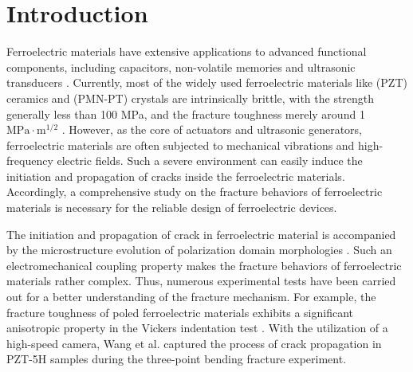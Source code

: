 \documentclass[final,times,fleqn,11pt]{elsarticle}
\begin{document}

\section{Introduction}

Ferroelectric materials have extensive applications to advanced functional components, including capacitors,  non-volatile memories and ultrasonic transducers \cite{martin_thin-film_2017}. Currently, most of the widely used ferroelectric materials like  (PZT) ceramics and  (PMN-PT) crystals are intrinsically brittle, with the strength generally less than 100 MPa, and the fracture toughness merely around {1 $\mathrm{MPa}\cdot\mathrm{m}^{1/2}$} \cite{schneider_influence_2007}. However, as the core of actuators and ultrasonic generators,  ferroelectric materials are often subjected to mechanical vibrations and high-frequency electric fields. Such a severe environment can easily induce the initiation and propagation of cracks inside the ferroelectric materials. Accordingly, a comprehensive study on the fracture behaviors of ferroelectric materials is necessary for the reliable design of ferroelectric devices. 

The initiation and propagation of crack in ferroelectric material is accompanied by the microstructure evolution of polarization domain morphologies \cite{yingwei_influence_2020}. Such an electromechanical coupling property makes the fracture behaviors of ferroelectric materials rather complex. Thus, numerous experimental tests have been carried out for a better understanding of the fracture mechanism. For example, the fracture toughness of poled ferroelectric materials exhibits a significant anisotropic property in the Vickers indentation test \cite{yamamoto_internal_1983,okazaki_electro-mechanical_1992,lynch_crack_1995}. With the utilization of a high-speed camera, Wang et al. \cite{wang_influence_2020} captured the process of crack propagation in PZT-5H samples during the three-point bending fracture experiment. 
\end{document}
